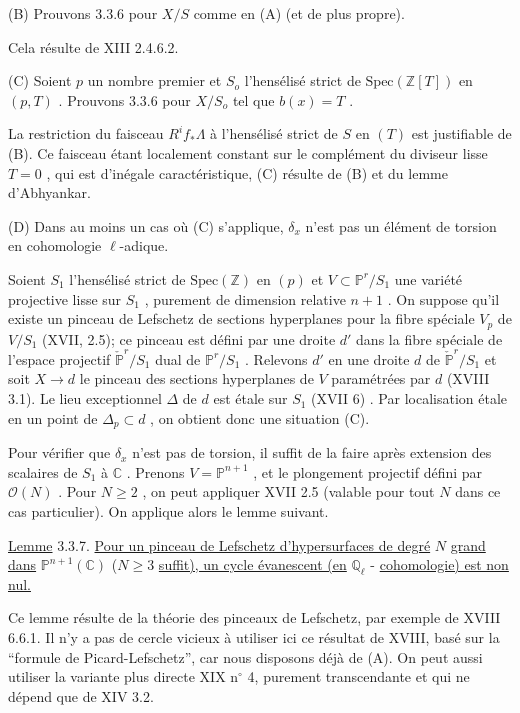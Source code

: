 (B) Prouvons 3.3.6 pour $X/S$ comme en (A) (et de plus propre).

Cela résulte de XIII 2.4.6.2.

(C) Soient $p$ un nombre premier et $S_o$ l'hensélisé strict de $\mathrm{Spec}(\mathbb{Z}[T])$ en $(p,T)$ . Prouvons 3.3.6 pour $X/S_o$ tel que $b(x) = T$ .

La restriction du faisceau $R^i f_* \Lambda$ à l'hensélisé strict de $S$ en $(T)$ est justifiable de (B). Ce faisceau étant localement constant sur le complément du diviseur lisse $T = 0$ , qui est d'inégale caractéristique, (C) résulte de (B) et du lemme d'Abhyankar.

(D) Dans au moins un cas où (C) s'applique, $\delta_x$ n'est pas un élément de torsion en cohomologie $\ell$-adique.



Soient $S_1$ l'hensélisé strict de $\mathrm{Spec}(\mathbb{Z})$ en $(p)$ et $V \subset \mathbb{P}^r/S_1$ une variété projective lisse sur $S_1$ , purement de dimension relative $n+1$ . On suppose qu'il existe un pinceau de Lefschetz de sections hyperplanes pour la fibre spéciale $V_p$ de $V/S_1$ (XVII, 2.5); ce pinceau est défini par une droite $d'$ dans la fibre spéciale de l'espace projectif $\check{\mathbb{P}}^r/S_1$ dual de $\mathbb{P}^r/S_1$ . Relevons $d'$ en une droite $d$ de $\check{\mathbb{P}}^r/S_1$ et soit $X \to d$ le pinceau des sections hyperplanes de $V$ paramétrées par $d$ (XVIII 3.1). Le lieu exceptionnel $\Delta$ de $d$ est étale sur $S_1$ (XVII 6) . Par localisation étale en un point de $\Delta_p \subset d$ , on obtient donc une situation (C).

Pour vérifier que $\delta_x$ n'est pas de torsion, il suffit de la faire après extension des scalaires de $S_1$ à $\mathbb{C}$ . Prenons $V = \mathbb{P}^{n+1}$ , et le plongement projectif défini par $\mathcal{O}(N)$ . Pour $N \geq 2$ , on peut appliquer XVII 2.5 (valable pour tout $N$ dans ce cas particulier). On applique alors le lemme suivant.

\underline{Lemme} 3.3.7. \underline{Pour un pinceau de Lefschetz d'hypersurfaces de degré} $N$ \underline{grand dans} $\mathbb{P}^{n+1}(\mathbb{C})$ ($N \geq 3$ \underline{suffit), un cycle évanescent (en} $\mathbb{Q}_{\ell}$ - \underline{cohomologie) est non nul.}

Ce lemme résulte de la théorie des pinceaux de Lefschetz, par exemple de XVIII 6.6.1. Il n'y a pas de cercle vicieux à utiliser ici ce résultat de XVIII, basé sur la ``formule de Picard-Lefschetz'', car nous disposons déjà de (A). On peut aussi utiliser la variante plus directe XIX n$^{\circ}$ 4, purement transcendante et qui ne dépend que de XIV 3.2.

